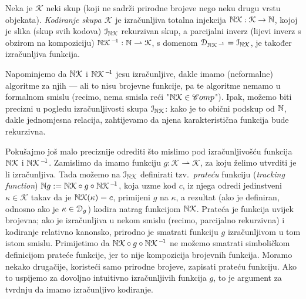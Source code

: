 \begin{definicija}[{name=[kodiranje]}]
	Neka je $\mathcal K$ neki skup (koji ne sadrži prirodne brojeve nego neku drugu vrstu objekata). \emph{Kodiranje skupa $\mathcal K$} je izračunljiva totalna injekcija ${\mathbb N}\mathcal K:\mathcal K\to{\mathbb N}$, kojoj je slika (skup svih kodova) $\mathcal I_{{\mathbb N}\mathcal K}$ rekurzivan skup, a parcijalni inverz (lijevi inverz s obzirom na kompoziciju) ${\mathbb N}\mathcal K^{\,-\!1}:{\mathbb N}\rightharpoonup\mathcal K$, s domenom $\mathcal D_{{\mathbb N}\mathcal K^{\,-\!1}}=\mathcal I_{{\mathbb N}\mathcal K}$, je također izračunljiva funkcija.
\end{definicija}

Napominjemo da ${{\mathbb N}\mathcal K}$ i ${\mathbb N}\mathcal K^{\,-\!1}$ jesu izračunljive, dakle imamo (neformalne) algoritme za njih --- ali to nisu brojevne funkcije, pa te algoritme nemamo u formalnom smislu (recimo, nema smisla reći "${\mathbb N}\mathcal K\in\mathscr Comp$"). Ipak, možemo biti precizni u pogledu izračunljivosti skupa $\mathcal I_{{\mathbb N}\mathcal K}$: kako je to obični podskup od ${\mathbb N}$, dakle jednomjesna relacija, zahtijevamo da njena karakteristična funkcija bude rekurzivna.

Pokušajmo još malo preciznije odrediti što mislimo pod izračunljivošću funkcija ${{\mathbb N}\mathcal K}$ i ${\mathbb N}\mathcal K^{\,-\!1}$. Zamislimo da imamo funkciju $g:\mathcal K\rightharpoonup\mathcal K$, za koju želimo utvrditi je li izračunljiva. Tada možemo na $\mathcal I_{{\mathbb N}\mathcal K}$ definirati tzv.\ \emph{prateću} funkciju (\emph{tracking function}) ${\mathbb N} g:={{\mathbb N}\mathcal K}\circ g\circ{\mathbb N}\mathcal K^{\,-\!1}$, koja uzme kod $c$, iz njega odredi jedinstveni $\kappa\in\mathcal K$ takav da je ${{\mathbb N}\mathcal K}(\kappa)=c$, primijeni $g$ na $\kappa$, a rezultat (ako je definiran, odnosno ako je $\kappa\in\mathcal D_{g}$) kodira natrag funkcijom ${{\mathbb N}\mathcal K}$. Prateća je funkcija uvijek brojevna; ako je izračunljiva u nekom smislu (recimo, parcijalno rekurzivna) i kodiranje relativno kanonsko, prirodno je smatrati funkciju $g$ izračunljivom u tom istom smislu. Primijetimo da ${{\mathbb N}\mathcal K}\circ g\circ{\mathbb N}\mathcal K^{\,-\!1}$ ne možemo smatrati simboličkom definicijom prateće funkcije, jer to nije kompozicija brojevnih funkcija. Moramo nekako drugačije, koristeći samo prirodne brojeve, zapisati prateću funkciju. Ako to uspijemo za dovoljno intuitivno izračunljivih funkcija $g$, to je argument za tvrdnju da imamo izračunljivo kodiranje.

